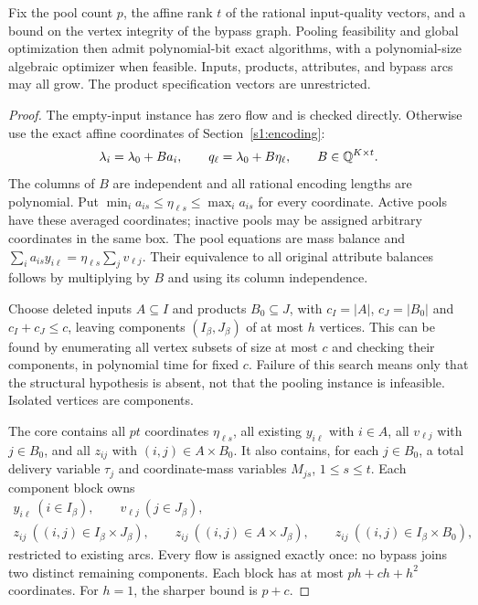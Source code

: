 \begin{theorem}\label{s4:vertex-integrity}
Fix the pool count $p$, the affine rank $t$ of the rational input-quality
vectors, and a bound on the vertex integrity of the bypass graph.
Pooling feasibility and global optimization then admit polynomial-bit
exact algorithms, with a polynomial-size algebraic optimizer when
feasible. Inputs, products, attributes, and bypass arcs may all grow.
The product specification vectors are unrestricted.
\end{theorem}
\begin{proof}
The empty-input instance has zero flow and is checked directly. Otherwise
use the exact affine coordinates of Section~\ref{s1:encoding}:
\begin{equation}
 \lambda_i=\lambda_0+Ba_i,\qquad q_\ell=\lambda_0+B\eta_\ell,
 \qquad B\in\mathbb Q^{K\times t}.
 \label{s4:quality-coordinates}
\end{equation}
The columns of $B$ are independent and all rational encoding lengths
are polynomial. Put
$\min_i a_{is}\le\eta_{\ell s}\le\max_i a_{is}$ for every coordinate.
Active pools have these averaged coordinates; inactive pools may be
assigned arbitrary coordinates in the same box. The pool equations
are mass balance and
$\sum_i a_{is}y_{i\ell}=\eta_{\ell s}\sum_jv_{\ell j}$.
Their equivalence to all original attribute balances follows by
multiplying by $B$ and using its column independence.

Choose deleted inputs $A\subseteq I$ and products $B_0\subseteq J$,
with $c_I=|A|$, $c_J=|B_0|$ and $c_I+c_J\le c$, leaving components
$(I_\beta,J_\beta)$ of at most $h$ vertices. This can be found by
enumerating all vertex subsets of size at most $c$ and checking their
components, in polynomial time for fixed $c$. Failure of this search
means only that the structural hypothesis is absent, not that the
pooling instance is infeasible. Isolated vertices are components.

The core contains all $pt$ coordinates $\eta_{\ell s}$, all existing
$y_{i\ell}$ with $i\in A$, all $v_{\ell j}$ with $j\in B_0$, and all
$z_{ij}$ with $(i,j)\in A\times B_0$. It also contains, for each
$j\in B_0$, a total delivery variable $\tau_j$ and coordinate-mass
variables $M_{js}$, $1\le s\le t$. Each component block owns
\begin{equation}
 \begin{gathered}
 y_{i\ell}\ (i\in I_\beta),\qquad
 v_{\ell j}\ (j\in J_\beta),\\
 z_{ij}\ ((i,j)\in I_\beta\times J_\beta),\qquad
 z_{ij}\ ((i,j)\in A\times J_\beta),\qquad
 z_{ij}\ ((i,j)\in I_\beta\times B_0),
 \end{gathered}\label{s4:ownership}
\end{equation}
restricted to existing arcs. Every flow is assigned exactly once: no
bypass joins two distinct remaining components. Each block has at
most $ph+ch+h^2$ coordinates. For $h=1$, the sharper bound is $p+c$.


\end{proof}
